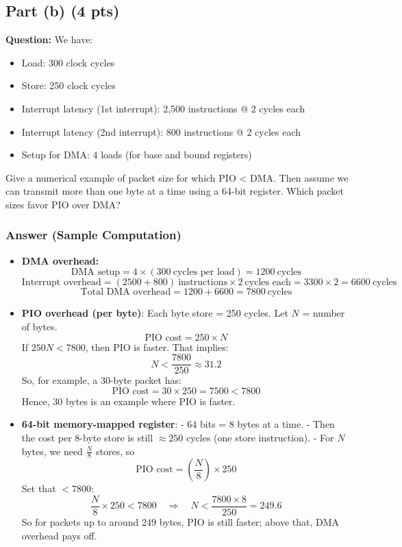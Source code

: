 \documentclass[12pt]{article}
\begin{document}
	\subsection*{Part (b) (4 pts)}
	\textbf{Question:} We have:
	\begin{itemize}
		\item Load: 300 clock cycles
		\item Store: 250 clock cycles
		\item Interrupt latency (1st interrupt): 2,500 instructions @ 2 cycles each
		\item Interrupt latency (2nd interrupt): 800 instructions @ 2 cycles each
		\item Setup for DMA: 4 loads (for base and bound registers)
	\end{itemize}
	Give a numerical example of packet size for which PIO < DMA. Then assume we can transmit more than one byte at a time using a 64-bit register. Which packet sizes favor PIO over DMA?
	
	\subsubsection*{Answer (Sample Computation)}
	\begin{itemize}
		\item \textbf{DMA overhead:}
		\[
		\text{DMA setup} = 4 \times (300\ \text{cycles per load}) = 1200\ \text{cycles}
		\]
		\[
		\text{Interrupt overhead} = (2500 + 800)\ \text{instructions} \times 2\ \text{cycles each} 
		= 3300 \times 2 = 6600\ \text{cycles}
		\]
		\[
		\text{Total DMA overhead} = 1200 + 6600 = 7800\ \text{cycles}
		\]
		
		\item \textbf{PIO overhead (per byte)}: Each byte store = 250 cycles. Let $N$ = number of bytes.
		\[
		\text{PIO cost} = 250 \times N
		\]
		If $250N < 7800$, then PIO is faster. That implies:
		\[
		N < \frac{7800}{250} \approx 31.2
		\]
		So, for example, a 30-byte packet has:
		\[
		\text{PIO cost} = 30 \times 250 = 7500 < 7800
		\]
		Hence, 30 bytes is an example where PIO is faster.
		
		\item \textbf{64-bit memory-mapped register}:
		- 64 bits = 8 bytes at a time.
		- Then the cost per 8-byte store is still $\approx 250$ cycles (one store instruction).
		- For $N$ bytes, we need $\frac{N}{8}$ stores, so
		\[
		\text{PIO cost} = \left(\frac{N}{8}\right) \times 250
		\]
		Set that $< 7800$:
		\[
		\frac{N}{8} \times 250 < 7800 \quad\Rightarrow\quad N < \frac{7800 \times 8}{250} = 249.6
		\]
		So for packets up to around 249 bytes, PIO is still faster; above that, DMA overhead pays off.
	\end{itemize}
	
\end{document}
